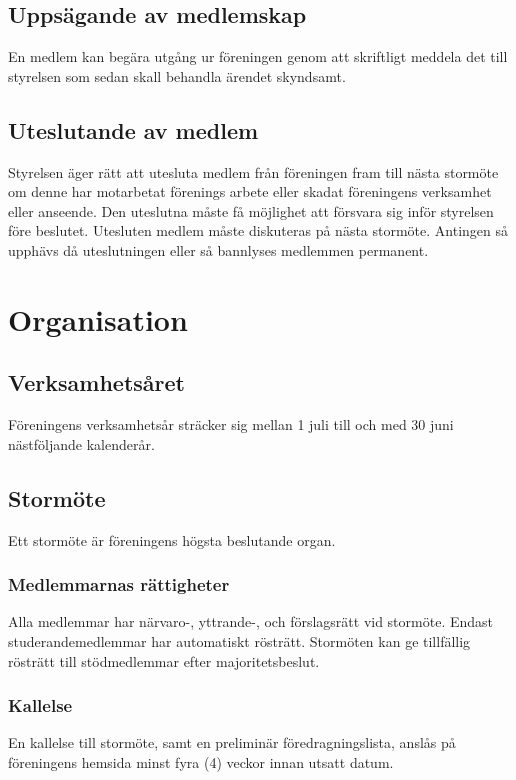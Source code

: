 \documentclass[11pt,a4paper]{article}
\begin{document}
\subsection{Uppsägande av medlemskap}
En medlem kan begära utgång ur föreningen genom att skriftligt meddela det till styrelsen som sedan skall behandla ärendet skyndsamt.
\subsection{Uteslutande av medlem}
Styrelsen äger rätt att utesluta medlem från föreningen fram till nästa
stormöte om denne har motarbetat förenings arbete eller skadat föreningens verksamhet eller anseende. Den uteslutna måste få möjlighet att försvara sig inför styrelsen före beslutet. Utesluten medlem måste diskuteras på nästa stormöte. Antingen så upphävs då uteslutningen eller så bannlyses medlemmen permanent.

\section{Organisation}
\subsection{Verksamhetsåret}
Föreningens verksamhetsår sträcker sig mellan 1 juli till och med 30 juni nästföljande kalenderår.
\subsection{Stormöte}
Ett stormöte är föreningens högsta beslutande organ.
\subsubsection{Medlemmarnas rättigheter}
Alla medlemmar har närvaro-, yttrande-, och förslagsrätt vid stormöte. Endast studerandemedlemmar har automatiskt rösträtt.
Stormöten kan ge  tillfällig rösträtt till stödmedlemmar efter majoritetsbeslut.
\subsubsection{Kallelse}\label{sec:kallelse}
En kallelse till stormöte, samt en preliminär föredragningslista, anslås på föreningens hemsida minst fyra (4) veckor innan utsatt datum.
\end{document}
